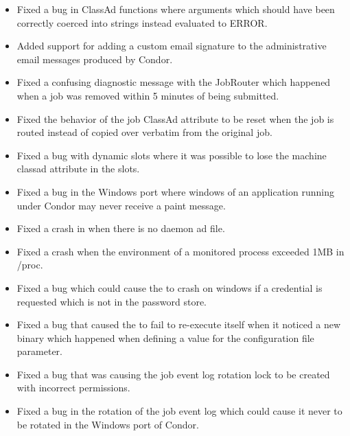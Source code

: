 \begin{itemize}

\item Fixed a bug in ClassAd functions where arguments which should have been
correctly coerced into strings instead evaluated to ERROR.

\item Added support for adding a custom email signature to the administrative
email messages produced by Condor. 

\item Fixed a confusing diagnostic message with the JobRouter which happened
when a job was removed within 5 minutes of being submitted.

\item Fixed the behavior of the job ClassAd attribute
 to be reset when the job is routed instead
of copied over verbatim from the original job.

\item Fixed a bug with dynamic slots where it was possible to lose the 
 machine classad attribute in the slots.

\item Fixed a bug in the Windows port where windows of an application running
under Condor may never receive a paint message.

\item Fixed a crash in   when there is no 
 daemon ad file.

\item Fixed a  crash when the environment of a monitored process
exceeded 1MB in /proc.

\item Fixed a bug which could cause the  to crash on windows if
a credential is requested which is not in the password store.

\item Fixed a bug that caused the  to fail to re-execute itself
when it noticed a new binary which happened when defining a value for the
 configuration file parameter.

\item Fixed a bug that was causing the job event log rotation lock to be
created with incorrect permissions.

\item Fixed a bug in the rotation of the job event log which could cause it
never to be rotated in the Windows port of Condor.


\end{itemize}
